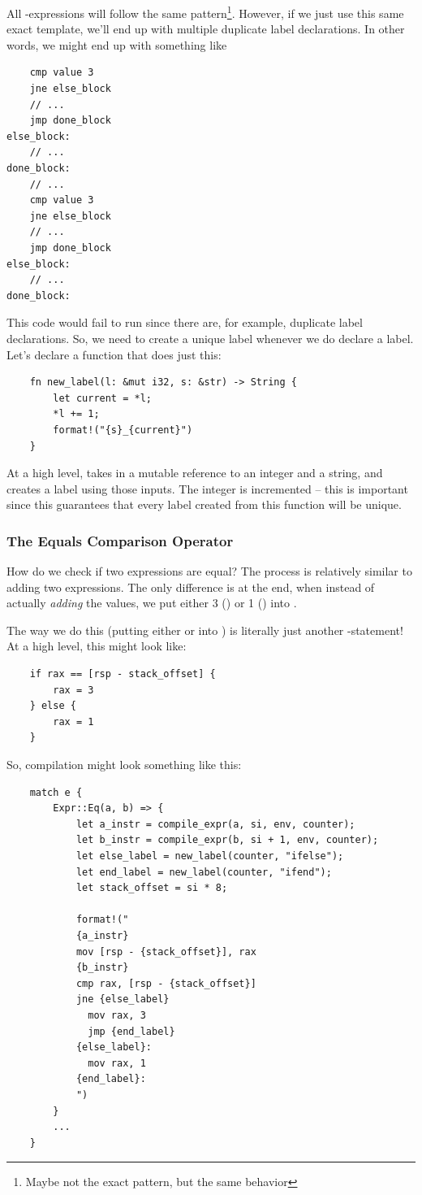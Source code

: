 \documentclass[letterpaper]{article}
\begin{document}
All -expressions will follow the same pattern\footnote{Maybe not the exact pattern, but the same behavior}. However, if we just use this same exact template, we'll end up with multiple duplicate label declarations. In other words, we might end up with something like 
\begin{verbatim}
    cmp value 3
    jne else_block 
    // ... 
    jmp done_block 
else_block:
    // ... 
done_block:
    // ...
    cmp value 3
    jne else_block 
    // ... 
    jmp done_block 
else_block:
    // ... 
done_block:\end{verbatim}
This code would fail to run since there are, for example, duplicate  label declarations. So, we need to create a unique label whenever we do declare a label. Let's declare a function that does just this: 
\begin{verbatim}
    fn new_label(l: &mut i32, s: &str) -> String {
        let current = *l;
        *l += 1;
        format!("{s}_{current}")
    }\end{verbatim}
At a high level,  takes in a mutable reference to an integer and a string, and creates a label using those inputs. The integer is incremented -- this is important since this guarantees that every label created from this function will be unique.

\subsubsection{The Equals Comparison Operator}
How do we check if two expressions are equal? The process is relatively similar to adding two expressions. The only difference is at the end, when instead of actually \emph{adding} the values, we put either 3 () or 1 () into .

\bigskip 

The way we do this (putting either  or  into ) is literally just another -statement! At a high level, this might look like: 
\begin{verbatim}
    if rax == [rsp - stack_offset] {
        rax = 3
    } else {
        rax = 1
    }\end{verbatim}
So, compilation might look something like this: 
\begin{verbatim}
    match e {
        Expr::Eq(a, b) => {
            let a_instr = compile_expr(a, si, env, counter);
            let b_instr = compile_expr(b, si + 1, env, counter);
            let else_label = new_label(counter, "ifelse");
            let end_label = new_label(counter, "ifend");
            let stack_offset = si * 8;

            format!("
            {a_instr}
            mov [rsp - {stack_offset}], rax
            {b_instr}
            cmp rax, [rsp - {stack_offset}]
            jne {else_label}
              mov rax, 3
              jmp {end_label}
            {else_label}:
              mov rax, 1
            {end_label}:
            ")
        }
        ...
    }\end{verbatim}
\end{document}
